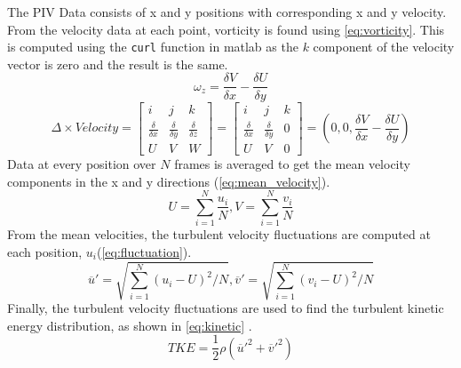 The PIV Data consists of x and y positions with corresponding x and y velocity. From the velocity data at each point, vorticity is found using \autoref{eq:vorticity}. This is computed using the \verb|curl| function in \acrfull{matlab} as the $k$ component of the velocity vector is zero and the result is the same.
\begin{equation}\label{eq:vorticity}
    \omega _z = \frac{\delta V}{\delta x} - \frac{\delta U}{\delta y}
\end{equation}
\begin{equation}\label{eq:curl}
    \Delta \times Velocity = \begin{bmatrix} i & j & k \\ \frac{\delta}{\delta x} & \frac{\delta}{\delta y} & \frac{\delta}{\delta z} \\ U & V & W \end{bmatrix} = \begin{bmatrix} i & j & k \\ \frac{\delta}{\delta x} & \frac{\delta}{\delta y} & 0 \\ U & V & 0 \end{bmatrix} = (0,0,\frac{\delta V}{\delta x} - \frac{\delta U}{\delta y})
\end{equation}
Data at every position over $N$ frames is averaged to get the mean velocity components in the x and y directions (\autoref{eq:mean_velocity}). 
\begin{equation}\label{eq:mean_velocity}
    U = \sum^N_{i=1} \frac{u_i}{N}, V = \sum^N_{i=1} \frac{v_i}{N} 
\end{equation}
From the mean velocities, the turbulent velocity fluctuations are computed at each position, $u_i$(\autoref{eq:fluctuation}).
\begin{equation}\label{eq:fluctuation}
    \overline{u}' = \sqrt{\sum^N_{i=1}(u_i-U)^2/N},
    \overline{v}' = \sqrt{\sum^N_{i=1}(v_i-U)^2/N}
\end{equation}
Finally, the turbulent velocity fluctuations are used to find the turbulent kinetic energy distribution, as shown in \autoref{eq:kinetic} \citep{lab11-manual}.
\begin{equation}\label{eq:kinetic}
    TKE = \frac{1}{2}\rho(\overline{u}'^2 + \overline{v}'^2)
\end{equation}

